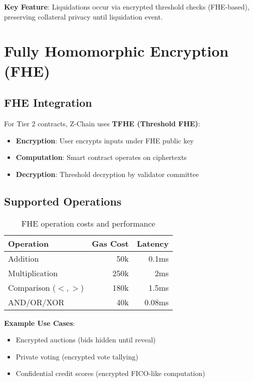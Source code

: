 \documentclass[11pt]{article}
\begin{document}
\textbf{Key Feature}: Liquidations occur via encrypted threshold checks (FHE-based), preserving collateral privacy until liquidation event.

\section{Fully Homomorphic Encryption (FHE)}

\subsection{FHE Integration}

For Tier 2 contracts, Z-Chain uses \textbf{TFHE (Threshold FHE)}:

\begin{itemize}[leftmargin=1.1em]
  \item \textbf{Encryption}: User encrypts inputs under FHE public key
  \item \textbf{Computation}: Smart contract operates on ciphertexts
  \item \textbf{Decryption}: Threshold decryption by validator committee
\end{itemize}

\subsection{Supported Operations}

\begin{table}[h]
\centering
\begin{tabular}{lrr}
\toprule
Operation & Gas Cost & Latency \\
\midrule
Addition & 50k & 0.1ms \\
Multiplication & 250k & 2ms \\
Comparison ($<, >$) & 180k & 1.5ms \\
AND/OR/XOR & 40k & 0.08ms \\
\bottomrule
\end{tabular}
\caption{FHE operation costs and performance}
\end{table}

\textbf{Example Use Cases}:
\begin{itemize}[leftmargin=1.1em]
  \item Encrypted auctions (bids hidden until reveal)
  \item Private voting (encrypted vote tallying)
  \item Confidential credit scores (encrypted FICO-like computation)
\end{itemize}
\end{document}
